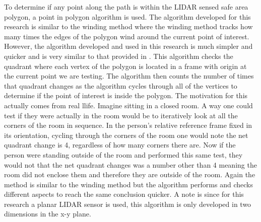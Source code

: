 \documentclass[12pt,onecolumn]{report}
\begin{document}
To determine if any point along the path is within the LIDAR sensed safe area polygon, a point in polygon algorithm is used. The algorithm developed for this research is similar to the winding method where the winding method tracks how many times the edges of the polygon wind around the current point of interest. However, the algorithm developed and used in this research is much simpler and quicker and is very similar to that provided in \cite{pointinpolygon2014}. This algorithm checks the quadrant where each vertex of the polygon is located in a frame with origin at the current point we are testing. The algorithm then counts the number of times that quadrant changes as the algorithm cycles through all of the vertices to determine if the point of interest is inside the polygon. The motivation for this actually comes from real llife. Imagine sitting in a closed room. A way one could test if they were actually in the room would be to iteratively look at all the corners of the room in sequence. In the person's relative reference frame fixed in its orientation, cycling through the corners of the room one would note the net quadrant change is 4, regardless of how many corners there are. Now if the person were standing outside of the room and performed this same test, they would not that the net quadrant changes was a number other than 4 meaning the room did not enclose them and therefore they are outside of the room. Again the method is similar to the winding method but the algorithm performs and checks different aspects to reach the same conclusion quicker. A note is since for this research a planar LIDAR sensor is used, this algorithm is only developed in two dimensions in the x-y plane. 
\end{document}

